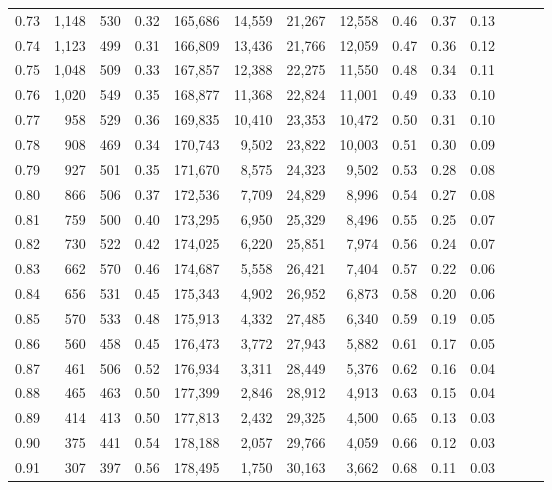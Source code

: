 \begin{tabular}{rrrrrrrrrrrrrr}
0.73 &  1,148 &  530 &  0.32 &  165,686 &   14,559 &  21,267 &  12,558 &  0.46 &  0.37 &      0.13 \\
0.74 &  1,123 &  499 &  0.31 &  166,809 &   13,436 &  21,766 &  12,059 &  0.47 &  0.36 &      0.12 \\
0.75 &  1,048 &  509 &  0.33 &  167,857 &   12,388 &  22,275 &  11,550 &  0.48 &  0.34 &      0.11 \\
0.76 &  1,020 &  549 &  0.35 &  168,877 &   11,368 &  22,824 &  11,001 &  0.49 &  0.33 &      0.10 \\
0.77 &    958 &  529 &  0.36 &  169,835 &   10,410 &  23,353 &  10,472 &  0.50 &  0.31 &      0.10 \\
0.78 &    908 &  469 &  0.34 &  170,743 &    9,502 &  23,822 &  10,003 &  0.51 &  0.30 &      0.09 \\
0.79 &    927 &  501 &  0.35 &  171,670 &    8,575 &  24,323 &   9,502 &  0.53 &  0.28 &      0.08 \\
0.80 &    866 &  506 &  0.37 &  172,536 &    7,709 &  24,829 &   8,996 &  0.54 &  0.27 &      0.08 \\
0.81 &    759 &  500 &  0.40 &  173,295 &    6,950 &  25,329 &   8,496 &  0.55 &  0.25 &      0.07 \\
0.82 &    730 &  522 &  0.42 &  174,025 &    6,220 &  25,851 &   7,974 &  0.56 &  0.24 &      0.07 \\
0.83 &    662 &  570 &  0.46 &  174,687 &    5,558 &  26,421 &   7,404 &  0.57 &  0.22 &      0.06 \\
0.84 &    656 &  531 &  0.45 &  175,343 &    4,902 &  26,952 &   6,873 &  0.58 &  0.20 &      0.06 \\
0.85 &    570 &  533 &  0.48 &  175,913 &    4,332 &  27,485 &   6,340 &  0.59 &  0.19 &      0.05 \\
0.86 &    560 &  458 &  0.45 &  176,473 &    3,772 &  27,943 &   5,882 &  0.61 &  0.17 &      0.05 \\
0.87 &    461 &  506 &  0.52 &  176,934 &    3,311 &  28,449 &   5,376 &  0.62 &  0.16 &      0.04 \\
0.88 &    465 &  463 &  0.50 &  177,399 &    2,846 &  28,912 &   4,913 &  0.63 &  0.15 &      0.04 \\
0.89 &    414 &  413 &  0.50 &  177,813 &    2,432 &  29,325 &   4,500 &  0.65 &  0.13 &      0.03 \\
0.90 &    375 &  441 &  0.54 &  178,188 &    2,057 &  29,766 &   4,059 &  0.66 &  0.12 &      0.03 \\
0.91 &    307 &  397 &  0.56 &  178,495 &    1,750 &  30,163 &   3,662 &  0.68 &  0.11 &      0.03 \\

\end{tabular}
